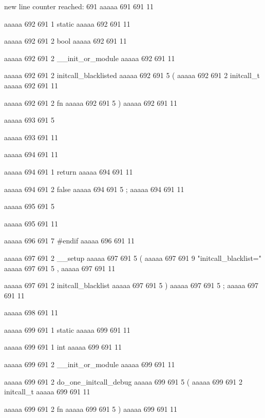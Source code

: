 new line counter reached: 691
aaaaa 691 691
11


aaaaa 692 691
1
static
aaaaa 692 691
11
 
aaaaa 692 691
2
bool
aaaaa 692 691
11
 
aaaaa 692 691
2
__init_or_module
aaaaa 692 691
11
 
aaaaa 692 691
2
initcall_blacklisted
aaaaa 692 691
5
(
aaaaa 692 691
2
initcall_t
aaaaa 692 691
11
 
aaaaa 692 691
2
fn
aaaaa 692 691
5
)
aaaaa 692 691
11


aaaaa 693 691
5
{
aaaaa 693 691
11


aaaaa 694 691
11
	
aaaaa 694 691
1
return
aaaaa 694 691
11
 
aaaaa 694 691
2
false
aaaaa 694 691
5
;
aaaaa 694 691
11


aaaaa 695 691
5
}
aaaaa 695 691
11


aaaaa 696 691
7
#endif
aaaaa 696 691
11


aaaaa 697 691
2
__setup
aaaaa 697 691
5
(
aaaaa 697 691
9
"initcall_blacklist="
aaaaa 697 691
5
,
aaaaa 697 691
11
 
aaaaa 697 691
2
initcall_blacklist
aaaaa 697 691
5
)
aaaaa 697 691
5
;
aaaaa 697 691
11


aaaaa 698 691
11


aaaaa 699 691
1
static
aaaaa 699 691
11
 
aaaaa 699 691
1
int
aaaaa 699 691
11
 
aaaaa 699 691
2
__init_or_module
aaaaa 699 691
11
 
aaaaa 699 691
2
do_one_initcall_debug
aaaaa 699 691
5
(
aaaaa 699 691
2
initcall_t
aaaaa 699 691
11
 
aaaaa 699 691
2
fn
aaaaa 699 691
5
)
aaaaa 699 691
11


